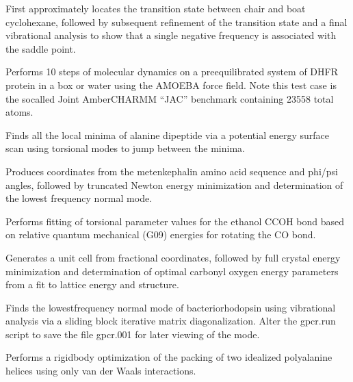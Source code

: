 \documentclass[letterpaper,11pt,english]{sphinxmanual}
\begin{document}

First approximately locates the transition state between chair and boat cyclohexane, followed by subsequent refinement of the transition state and a final vibrational analysis to show that a single negative frequency is associated with the saddle point.


Performs 10 steps of molecular dynamics on a pre\sphinxhyphen{}equilibrated system of DHFR protein in a box or water using the AMOEBA force field. Note this test case is the so\sphinxhyphen{}called Joint Amber\sphinxhyphen{}CHARMM “JAC” benchmark containing 23558 total atoms.


Finds all the local minima of alanine dipeptide via a potential energy surface scan using torsional modes to jump between the minima.


Produces coordinates from the met\sphinxhyphen{}enkephalin amino acid sequence and phi/psi angles, followed by truncated Newton energy minimization and determination of the lowest frequency normal mode.


Performs fitting of torsional parameter values for the ethanol C\sphinxhyphen{}C\sphinxhyphen{}O\sphinxhyphen{}H bond based on relative quantum mechanical (G09) energies for rotating the C\sphinxhyphen{}O bond.


Generates a unit cell from fractional coordinates, followed by full crystal energy minimization and determination of optimal carbonyl oxygen energy parameters from a fit to lattice energy and structure.


Finds the lowest\sphinxhyphen{}frequency normal mode of bacteriorhodopsin using vibrational analysis via a sliding block iterative matrix diagonalization. Alter the gpcr.run script to save the file gpcr.001 for later viewing of the mode.


Performs a rigid\sphinxhyphen{}body optimization of the packing of two idealized polyalanine helices using only van der Waals interactions.

\end{document}
